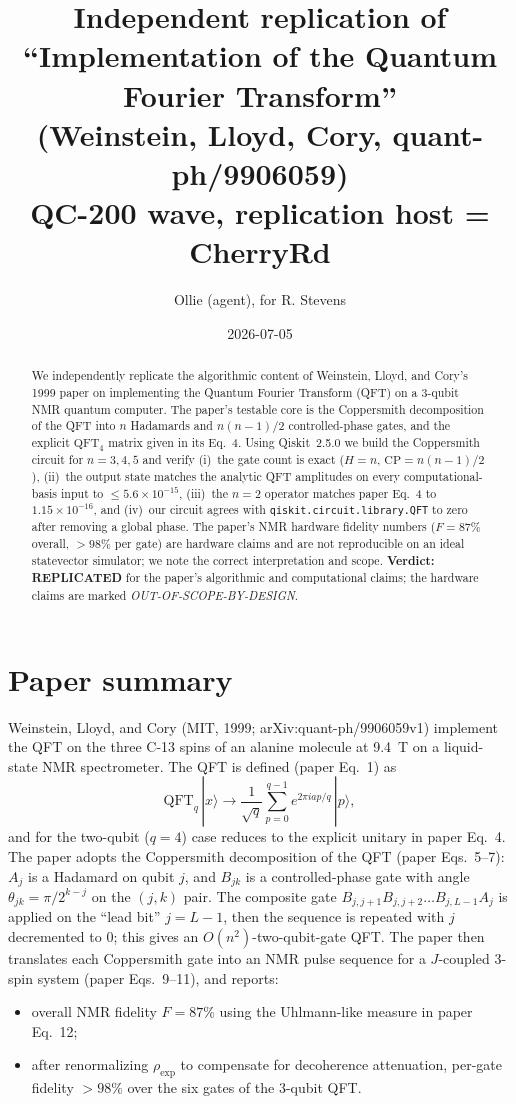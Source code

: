 \documentclass[11pt]{article}
\title{Independent replication of\\
       ``Implementation of the Quantum Fourier Transform''\\
       (Weinstein, Lloyd, Cory, quant-ph/9906059)\\[0.3em]
       \large QC-200 wave, replication host = CherryRd}
\author{Ollie (agent), for R. Stevens}
\date{2026-07-05}
\begin{document}
\maketitle

\begin{abstract}
We independently replicate the algorithmic content of Weinstein, Lloyd, and
Cory's 1999 paper on implementing the Quantum Fourier Transform (QFT) on a
3-qubit NMR quantum computer. The paper's testable core is the
Coppersmith decomposition of the QFT into $n$ Hadamards and $n(n-1)/2$
controlled-phase gates, and the explicit $\text{QFT}_4$ matrix given in
its Eq.~4. Using Qiskit~2.5.0 we build the Coppersmith circuit for
$n=3,4,5$ and verify (i)~the gate count is exact
($H=n$, $\text{CP}=n(n-1)/2$), (ii)~the output state matches the analytic
QFT amplitudes on every computational-basis input to
$\le 5.6\times10^{-15}$, (iii)~the $n=2$ operator matches paper
Eq.~4 to $1.15\times10^{-16}$, and (iv)~our circuit agrees with
\texttt{qiskit.circuit.library.QFT} to zero after removing a global
phase. The paper's NMR hardware fidelity numbers ($F=87\%$ overall,
$>98\%$ per gate) are hardware claims and are not reproducible on an
ideal statevector simulator; we note the correct interpretation and
scope. \textbf{Verdict: REPLICATED} for the paper's algorithmic and
computational claims; the hardware claims are marked
\emph{OUT-OF-SCOPE-BY-DESIGN}.
\end{abstract}

\section{Paper summary}

Weinstein, Lloyd, and Cory (MIT, 1999; arXiv:quant-ph/9906059v1)
implement the QFT on the three C-13 spins of an alanine molecule at
9.4~T on a liquid-state NMR spectrometer. The QFT is defined
(paper Eq.~1) as
\[
\text{QFT}_q\,|x\rangle \to \frac{1}{\sqrt{q}}\sum_{p=0}^{q-1}
   e^{2\pi i a p / q}\,|p\rangle,
\]
and for the two-qubit ($q=4$) case reduces to the explicit unitary in
paper Eq.~4. The paper adopts the Coppersmith decomposition of the QFT
(paper Eqs.~5--7): $A_j$ is a Hadamard on qubit $j$, and $B_{jk}$ is a
controlled-phase gate with angle $\theta_{jk} = \pi/2^{k-j}$ on the
$(j,k)$ pair. The composite gate $B_{j,j+1} B_{j,j+2}\ldots B_{j,L-1}
A_j$ is applied on the ``lead bit'' $j = L-1$, then the sequence is
repeated with $j$ decremented to $0$; this gives an $O(n^2)$-two-qubit-gate
QFT. The paper then translates each Coppersmith gate into an NMR pulse
sequence for a $J$-coupled 3-spin system (paper Eqs.~9--11), and
reports:
\begin{itemize}
  \item overall NMR fidelity $F = 87\%$ using the Uhlmann-like measure
        in paper Eq.~12;
  \item after renormalizing $\rho_\text{exp}$ to compensate for
        decoherence attenuation, per-gate fidelity $>98\%$ over the six
        gates of the 3-qubit QFT.
\end{itemize}
\end{document}
